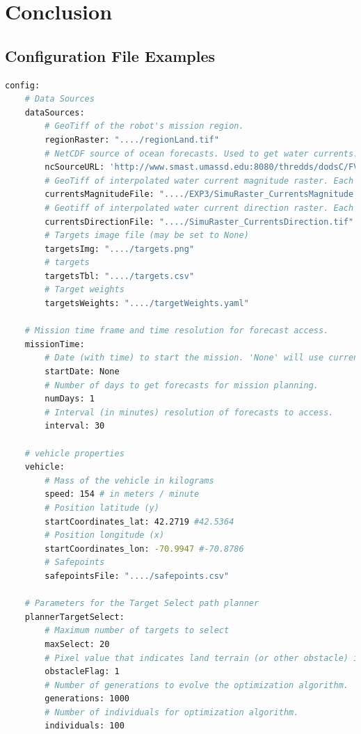 \documentclass{tamuccthesis}
\begin{document}
\chapter{Conclusion}



\begin{appendices}
\chapter{Configuration File Examples}
\label{apx:config_files}

\begin{lstlisting}[language=bash, basicstyle=\small, label=lst:system_config, caption=Example system configuration file]
config:
    # Data Sources
    dataSources:
        # GeoTiff of the robot's mission region.
        regionRaster: "..../regionLand.tif"
        # NetCDF source of ocean forecasts. Used to get water currents.
        ncSourceURL: 'http://www.smast.umassd.edu:8080/thredds/dodsC/FVCOM/NECOFS/Forecasts/NECOFS_FVCOM_OCEAN_MASSBAY_FORECAST.nc'
        # GeoTiff of interpolated water current magnitude raster. Each band corresponds to time.
        currentsMagnitudeFile: "..../EXP3/SimuRaster_CurrentsMagnitude.tif"
        # Geotiff of interpolated water current direction raster. Each band corresponds to time.
        currentsDirectionFile: "..../SimuRaster_CurrentsDirection.tif"
        # Targets image file (may be set to None)
        targetsImg: "..../targets.png"
        # targets
        targetsTbl: "..../targets.csv" 
        # Target weights
        targetsWeights: "..../targetWeights.yaml"

    # Mission time frame and time resolution for forecast access. 
    missionTime:
        # Date (with time) to start the mission. 'None' will use current time. 
        startDate: None
        # Number of days to get forecasts for mission planning.
        numDays: 1
        # Interval (in minutes) resolution of forecasts to access.
        interval: 30

    # vehicle properties
    vehicle:
        # Mass of the vehicle in kilograms
        speed: 154 # in meters / minute
        # Position latitude (y)
        startCoordinates_lat: 42.2719 #42.5364
        # Position longitude (x)
        startCoordinates_lon: -70.9947 #-70.8786
        # Safepoints
        safepointsFile: "..../safepoints.csv"

    # Parameters for the Target Select path planner
    plannerTargetSelect:
        # Maximum number of targets to select
        maxSelect: 20
        # Pixel value that indicates land terrain (or other obstacle) in terrain raster.
        obstacleFlag: 1
        # Number of generations to evolve the optimization algorithm.
        generations: 1000
        # Number of individuals for optimization algorithm.
        individuals: 100


\end{lstlisting}
\end{appendices}
\end{document}
